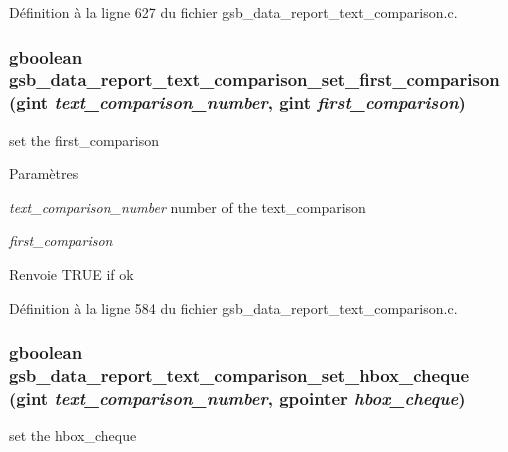 Définition à la ligne 627 du fichier gsb\_\-data\_\-report\_\-text\_\-comparison.c.

\subsubsection[{gsb\_\-data\_\-report\_\-text\_\-comparison\_\-set\_\-first\_\-comparison}]{\setlength{\rightskip}{0pt plus 5cm}gboolean gsb\_\-data\_\-report\_\-text\_\-comparison\_\-set\_\-first\_\-comparison (gint {\em text\_\-comparison\_\-number}, \/  gint {\em first\_\-comparison})}\label{gsb__data__report__text__comparison_8c_a53c572b90eaa4b8c9ad1d8fd529c8ad5}
set the first\_\-comparison


\begin{DoxyParams}{Paramètres}
\item[{\em text\_\-comparison\_\-number}]number of the text\_\-comparison \item[{\em first\_\-comparison}]\end{DoxyParams}
\begin{DoxyReturn}{Renvoie}
TRUE if ok 
\end{DoxyReturn}


Définition à la ligne 584 du fichier gsb\_\-data\_\-report\_\-text\_\-comparison.c.

\subsubsection[{gsb\_\-data\_\-report\_\-text\_\-comparison\_\-set\_\-hbox\_\-cheque}]{\setlength{\rightskip}{0pt plus 5cm}gboolean gsb\_\-data\_\-report\_\-text\_\-comparison\_\-set\_\-hbox\_\-cheque (gint {\em text\_\-comparison\_\-number}, \/  gpointer {\em hbox\_\-cheque})}\label{gsb__data__report__text__comparison_8c_ad353b408c433fda5f33c0efec96906ad}
set the hbox\_\-cheque


